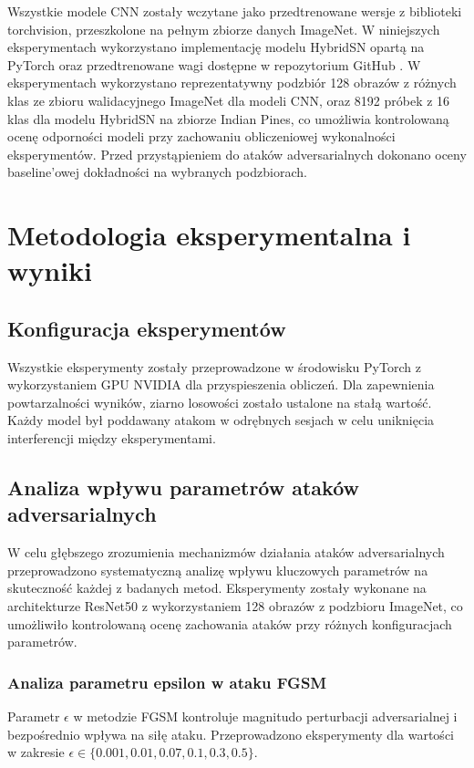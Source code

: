 \documentclass[12pt]{article}
\begin{document}
Wszystkie modele CNN zostały wczytane jako przedtrenowane wersje z biblioteki torchvision, przeszkolone na pełnym zbiorze danych ImageNet. W niniejszych eksperymentach wykorzystano implementację modelu HybridSN opartą na PyTorch oraz przedtrenowane wagi dostępne w repozytorium GitHub \supercite{hybridsn_implementation}. W eksperymentach wykorzystano reprezentatywny podzbiór 128 obrazów z różnych klas ze zbioru walidacyjnego ImageNet dla modeli CNN, oraz 8192 próbek z 16 klas dla modelu HybridSN na zbiorze Indian Pines, co umożliwia kontrolowaną ocenę odporności modeli przy zachowaniu obliczeniowej wykonalności eksperymentów. Przed przystąpieniem do ataków adversarialnych dokonano oceny baseline'owej dokładności na wybranych podzbiorach.

\section{Metodologia eksperymentalna i wyniki}

\subsection{Konfiguracja eksperymentów}

Wszystkie eksperymenty zostały przeprowadzone w środowisku PyTorch z wykorzystaniem GPU NVIDIA dla przyspieszenia obliczeń. Dla zapewnienia powtarzalności wyników, ziarno losowości zostało ustalone na stałą wartość. Każdy model był poddawany atakom w odrębnych sesjach w celu uniknięcia interferencji między eksperymentami.

\subsection{Analiza wpływu parametrów ataków adversarialnych}

W celu głębszego zrozumienia mechanizmów działania ataków adversarialnych przeprowadzono systematyczną analizę wpływu kluczowych parametrów na skuteczność każdej z badanych metod. Eksperymenty zostały wykonane na architekturze ResNet50 z wykorzystaniem 128 obrazów z podzbioru ImageNet, co umożliwiło kontrolowaną ocenę zachowania ataków przy różnych konfiguracjach parametrów.

\subsubsection{Analiza parametru epsilon w ataku FGSM}

Parametr $\epsilon$ w metodzie FGSM kontroluje magnitudo perturbacji adversarialnej i bezpośrednio wpływa na siłę ataku. Przeprowadzono eksperymenty dla wartości w zakresie $\epsilon \in \{0.001, 0.01, 0.07, 0.1, 0.3, 0.5\}$.
\end{document}
